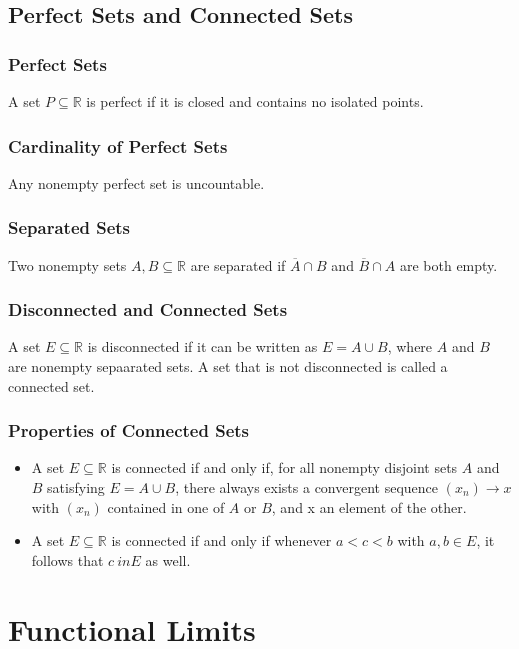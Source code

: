 \documentclass{article}
\begin{document}
\subsection{Perfect Sets and Connected Sets}

\subsubsection{Perfect Sets}

A set $ P \subseteq \mathbb{R} $ is perfect if it is closed and contains no isolated points. 

\subsubsection{Cardinality of Perfect Sets}
Any nonempty perfect set is uncountable.

\subsubsection{Separated Sets}
Two nonempty sets $A,B \subseteq \mathbb{R} $ are separated if $ \overline{A} \cap B $ and $ \overline{B} \cap A$ are both empty.

\subsubsection{Disconnected and Connected Sets}
A set $E \subseteq \mathbb{R} $ is disconnected if it can be written as $ E = A \cup B $, where $A$ and $B$ are nonempty sepaarated sets. A set that is not disconnected is called a connected set. 

\subsubsection{Properties of Connected Sets}

\begin{itemize}

\item A set $ E \subseteq \mathbb{R} $ is connected if and only if, for all nonempty disjoint sets $A$ and $B$ satisfying $E= A \cup B$, there always exists a convergent sequence $(x_n) \rightarrow x$ with $(x_n)$ contained in one of $A$ or $B$, and x an element of the other.

\item A set $E \subseteq \mathbb{R}$ is connected if and only if whenever $ a < c< b $ with $ a, b \in E$, it follows that $c \ in E$ as well. 

\end{itemize}


\section{Functional Limits}
\end{document}
